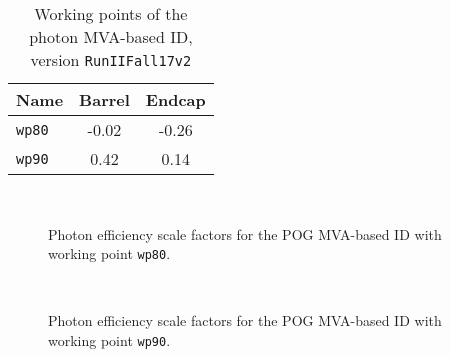 \begin{table}[ht]
\caption[.]{Working points of the photon MVA-based ID, version \texttt{RunIIFall17v2}}
\label{tab:MVAwpCuts}
\centering
\begin{tabular}{|l|c|c|}
\hline
Name & Barrel & Endcap \\
\hline
\texttt{wp80} & -0.02 & -0.26 \\
\texttt{wp90} &  0.42 &  0.14 \\
\hline
\end{tabular}
\end{table}

\begin{figure}
\begin{center}
%
\\
\end{center}
\caption{Photon efficiency scale factors for the POG MVA-based ID with working point \texttt{wp80}.}
\label{fig:phEffMVASF_wp80}
\end{figure}

\begin{figure}
\centering
{}%
\\
\caption{Photon efficiency scale factors for the POG MVA-based ID with working point \texttt{wp90}.}
\label{fig:phEffMVASF_wp90}
\end{figure}
